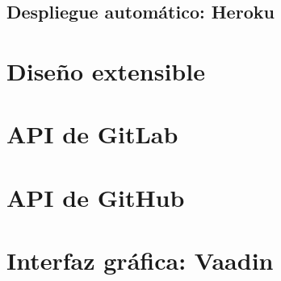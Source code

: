 \subsection{Despliegue automático: Heroku}


\section{Diseño extensible}
\section{API de GitLab} %
\section{API de GitHub} %
\section{Interfaz gráfica: Vaadin}